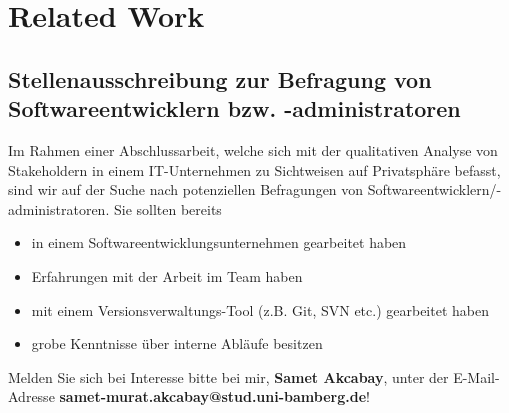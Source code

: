 \chapter{Related Work}

\section{Stellenausschreibung zur Befragung von Softwareentwicklern bzw. -administratoren} \label{ausschreibung}
Im Rahmen einer Abschlussarbeit, welche sich mit der qualitativen Analyse von Stakeholdern in einem IT-Unternehmen zu Sichtweisen auf Privatsphäre befasst, sind wir auf der Suche nach potenziellen Befragungen von Softwareentwicklern/-administratoren. Sie sollten bereits
\begin{itemize}
    \item in einem Softwareentwicklungsunternehmen gearbeitet haben
    \item Erfahrungen mit der Arbeit im Team haben
    \item mit einem Versionsverwaltungs-Tool (z.B. Git, SVN etc.) gearbeitet haben
    \item grobe Kenntnisse über interne Abläufe besitzen
\end{itemize}
Melden Sie sich bei Interesse bitte bei mir, \textbf{Samet Akcabay}, unter der E-Mail-Adresse \textbf{samet-murat.akcabay@stud.uni-bamberg.de}!

